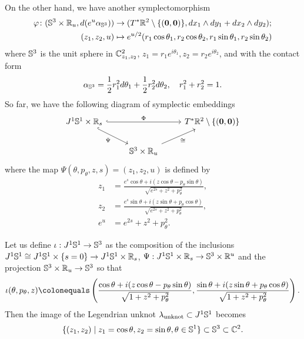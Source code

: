 On the other hand, we have another symplectomorphism 
\begin{align*}
\varphi \colon (\mathbb{S}^3\times \mathbb{R}_u,d(e^u\alpha_{\mathbb{S}^3}))&\to (T^*\mathbb{R}^2\setminus\{({\bf 0},{\bf 0})\},dx_1\wedge dy_1+dx_2\wedge dy_2);\\
(z_1,z_2,u)&\mapsto e^{u/2}(r_1\cos\theta_1,r_2\cos\theta_2, r_1\sin\theta_1,r_2\sin\theta_2)
\end{align*}
where $\mathbb{S}^3$ is the unit sphere in $\mathbb{C}^2_{z_1,z_2}$, $z_1=r_1 e^{i\theta_1}, z_2=r_2 e^{i\theta_2}$, and with the contact form
\begin{align*}
\alpha_{\mathbb{S}^3}=\frac{1}{2}r_1^2 d\theta_1 +\frac{1}{2} r_2^2d\theta_2,\quad r_1^2+r_2^2=1.
\end{align*}
So far, we have the following diagram of symplectic embeddings
\[
\begin{tikzcd}
J^1\sphere^1\times \R_s \arrow[rr, hookrightarrow, "\Phi"] \arrow[rd, hookrightarrow, "\Psi"'] & & T^*\R^2\setminus\{(\mathbf{0},\mathbf{0})\}\\
& \sphere^3\times\R_u \arrow[ru, "\cong"']
\end{tikzcd}
\]
where the map $\Psi(\theta, p_\theta, z, s) = (z_1, z_2, u)$ is defined by
\begin{align*}
z_1 &= \frac{e^s\cos\theta+ i (z\cos\theta-p_\theta\sin\theta)}{\sqrt{e^{2s}+z^2+p_\theta^2}},\\
z_2 &= \frac{e^s\sin\theta+ i (z\sin\theta+p_\theta\cos\theta)}{\sqrt{e^{2s}+z^2+p_\theta^2}},\\
e^u &= e^{2s}+z^2+p_\theta^2.
\end{align*}

Let us define $\iota:J^1\mathbb{S}^1\to \mathbb{S}^3$ as the composition of the inclusions
$J^1\mathbb{S}^1\cong J^1\mathbb{S}^1\times\{s=0\}\to J^1\mathbb{S}^1\times\mathbb{R}_s$, $\Psi:J^1\mathbb{S}^1\times\mathbb{R}_s\to \mathbb{S}^3\times\mathbb{R}^u$ and the projection $\mathbb{S}^3\times\mathbb{R}_u\to \mathbb{S}^3$ so that
\[
\iota(\theta, p_\theta, z)\colonequals
\left(
\frac{\cos\theta+i(z\cos\theta-p_\theta\sin\theta)}{\sqrt{1+z^2+p_\theta^2}},
\frac{\sin\theta+i(z\sin\theta+p_\theta\cos\theta)}{\sqrt{1+z^2+p_\theta^2}}
\right).
\]
Then the image of the Legendrian unknot $\lambda_{\rm unknot}\subset J^1\mathbb{S}^1$ becomes
\[
\{(z_1,z_2) \mid z_1=\cos\theta, z_2=\sin\theta, \theta\in\mathbb{S}^1\}\subset \mathbb{S}^3\subset \mathbb{C}^2.
\]

